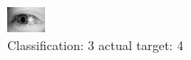 \begin{figure}[h!]
\begin{center}
\includegraphics[width=0.60\columnwidth]{figures/ID3122_class_3_target_4.png}
\end{center}
\caption{ Classification: 3 actual target: 4}
\label{fig:ID3122_class_3_target_4}
\end{figure}
